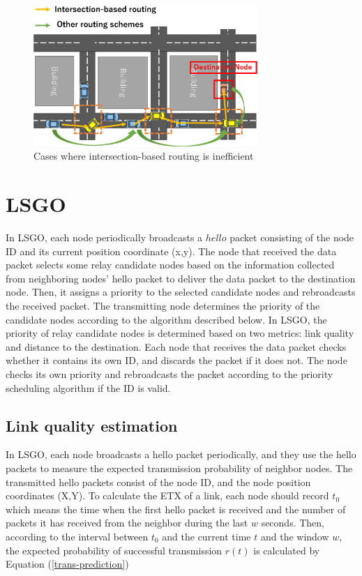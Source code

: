 \documentclass[conference]{IEEEtran}
\begin{document}
\begin{figure}[!ht]
\centering
\includegraphics[width=85mm]{figures/intersection_routing.eps}
\caption{Cases where intersection-based routing is inefficient}
\label{fig:intersection_routing}
\end{figure}



\section{LSGO}
\label{LSGO}

In LSGO, each node periodically broadcasts a $hello$ packet consisting of the node ID and its current position coordinate (x,y). 
The node that received the data packet  selects some relay candidate nodes based on the  information collected from neighboring nodes' hello packet  to deliver the data packet to the destination node. 
Then, it assigns a priority to the selected candidate nodes and rebroadcasts the received packet. 
The transmitting node  determines the priority of the candidate nodes according to  the algorithm described below. 
In LSGO, the priority of relay candidate nodes is determined based on two metrics: link quality and distance to the destination. 
Each node that receives the data packet checks whether it contains its own ID, and discards the packet if it does not.
The node checks its own priority and rebroadcasts the packet according to the priority scheduling algorithm if the ID  is valid.


\subsection{Link quality estimation}

  In LSGO, each node broadcasts a hello packet periodically, and they use the hello packets to measure the expected transmission probability of neighbor nodes.  The transmitted hello packets consist of the node ID, and the node position coordinates (X,Y).  To calculate the ETX of a link, each node should record $t_{0}$ which means the time when the first hello packet is received and the number of packets it has received from the neighbor during the last $w$ seconds. Then, according to the interval between $t_{0}$ and the current time $t$ and the window $w$, the expected probability of successful transmission $r(t)$ is calculated by Equation (\ref{trans-prediction})
\end{document}
